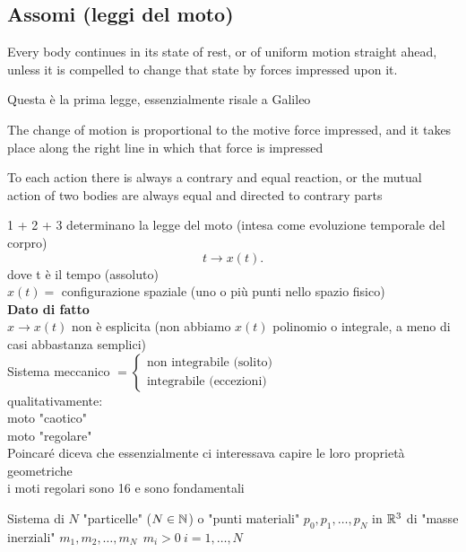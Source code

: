 \documentclass[12px]{article}
\begin{document}
	\subsection{Assomi (leggi del moto)}
	\begin{ass}
Every body continues in its state of rest, or of uniform motion straight ahead, unless it is compelled to change that state by forces impressed upon it. 
	\end{ass}
	Questa è la prima legge, essenzialmente risale a Galileo 
	\begin{ass}
		The change of motion is proportional to the motive force impressed, and it takes place along the right line in which that force is impressed
	\end{ass}
	\begin{ass}
		To each action there is always a contrary and equal reaction, or the mutual action of two bodies are always equal and directed to contrary parts
	\end{ass}
	1 + 2 + 3 determinano la legge del moto (intesa come evoluzione temporale del corpro)\\
	\[
	 t \rightarrow x(t)
	.\] 
	dove t è il tempo (assoluto)\\
	$x(t)=$ configurazione spaziale (uno o più punti nello spazio fisico)\\
	\textbf{Dato di fatto}\\
	$ x \rightarrow x(t)$ non è esplicita (non abbiamo $x(t)$ polinomio o integrale, a meno di casi abbastanza semplici)\\
	Sistema meccanico $ = \begin{cases}
		\text{non integrabile (solito)}\\
		\text{integrabile (eccezioni)}
	\end{cases}$ \\
	qualitativamente:\\
	moto "caotico"\\
	moto "regolare"\\
	Poincaré diceva che essenzialmente ci interessava capire le loro proprietà geometriche\\
	i moti regolari sono 16 e sono fondamentali\\
	\begin{defi}
		Sistema di $N$ "particelle" ($N\in\mathbb{N}$) o "punti materiali" $p_0,p_1,\ldots,p_N$ in $\mathbb{R}^3$ di "masse inerziali"  $m_1,m_2,\ldots, m_N \ \ m_i>0 \ i=1,\ldots,N$
	\end{defi}
\end{document}
